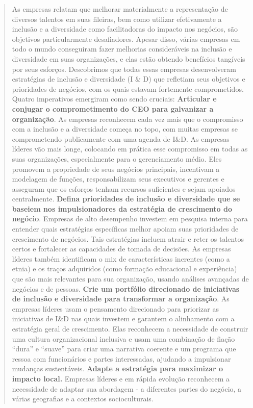 \begin{quote}
As empresas relatam que melhorar materialmente a representação de
diversos talentos em suas fileiras, bem como utilizar efetivamente a
inclusão e a diversidade como facilitadoras do impacto nos negócios, são
objetivos particularmente desafiadores. Apesar disso, várias empresas em
todo o mundo conseguiram fazer melhorias consideráveis ​​na inclusão e
diversidade em suas organizações, e elas estão obtendo benefícios
tangíveis por seus esforços. Descobrimos que todas essas empresas
desenvolveram estratégias de inclusão e diversidade (I \& D) que
refletiam seus objetivos e prioridades de negócios, com os quais estavam
fortemente comprometidos. Quatro imperativos emergiram como sendo
cruciais: \textbf{Articular e conjugar o comprometimento do CEO para
galvanizar a organização}. As empresas reconhecem cada vez mais que o
compromisso com a inclusão e a diversidade começa no topo, com muitas
empresas se comprometendo publicamente com uma agenda de I\&D. As
empresas líderes vão mais longe, colocando em prática esse compromisso
em todas as suas organizações, especialmente para o gerenciamento médio.
Eles promovem a propriedade de seus negócios principais, incentivam a
modelagem de funções, responsabilizam seus executivos e gerentes e
asseguram que os esforços tenham recursos suficientes e sejam apoiados
centralmente. \textbf{Defina prioridades de inclusão e diversidade que
se baseiem nos impulsionadores da estratégia de crescimento do negócio}.
Empresas de alto desempenho investem em pesquisa interna para entender
quais estratégias específicas melhor apoiam suas prioridades de
crescimento de negócios. Tais estratégias incluem atrair e reter os
talentos certos e fortalecer as capacidades de tomada de decisões. As
empresas líderes também identificam o mix de características inerentes
(como a etnia) e os traços adquiridos (como formação educacional e
experiência) que são mais relevantes para sua organização, usando
análises avançadas de negócios e de pessoas. \textbf{Crie um portfólio
direcionado de iniciativas de inclusão e diversidade para transformar a
organização}. As empresas líderes usam o pensamento direcionado para
priorizar as iniciativas de I\&D nas quais investem e garantem o
alinhamento com a estratégia geral de crescimento. Elas reconhecem a
necessidade de construir uma cultura organizacional inclusiva e usam uma
combinação de fiação ``dura'' e ``suave'' para criar uma narrativa
coerente e um programa que ressoa com funcionários e partes
interessadas, ajudando a impulsionar mudanças sustentáveis.
\textbf{Adapte a estratégia para maximizar o impacto local.} Empresas
líderes e em rápida evolução reconhecem a necessidade de adaptar sua
abordagem - a diferentes partes do negócio, a várias geografias e a
contextos socioculturais.
\end{quote}

